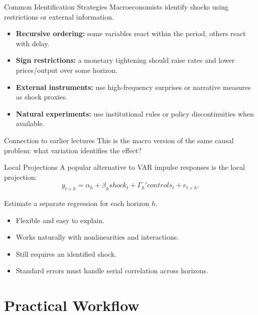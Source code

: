 \documentclass[11pt,aspectratio=169]{beamer}
\begin{document}
\begin{frame}{Common Identification Strategies}
  Macroeconomists identify shocks using restrictions or external information.

  \begin{itemize}
    \item \textbf{Recursive ordering:} some variables react within the period, others react with delay.
    \item \textbf{Sign restrictions:} a monetary tightening should raise rates and lower prices/output over some horizon.
    \item \textbf{External instruments:} use high-frequency surprises or narrative measures as shock proxies.
    \item \textbf{Natural experiments:} use institutional rules or policy discontinuities when available.
  \end{itemize}

  \begin{block}{Connection to earlier lectures}
    This is the macro version of the same causal problem: what variation identifies the effect?
  \end{block}
\end{frame}

\begin{frame}{Local Projections}
  A popular alternative to VAR impulse responses is the local projection:
  \[
    y_{t+h}=\alpha_h+\beta_h shock_t+\Gamma_h'controls_t+e_{t+h}.
  \]

  Estimate a separate regression for each horizon \(h\).

  \begin{itemize}
    \item Flexible and easy to explain.
    \item Works naturally with nonlinearities and interactions.
    \item Still requires an identified shock.
    \item Standard errors must handle serial correlation across horizons.
  \end{itemize}
\end{frame}

\section{Practical Workflow}
\end{document}
